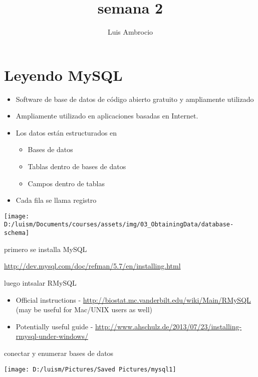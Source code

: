 \documentclass[
]{article}
\title{semana 2}
\author{Luis Ambrocio}
\date{}
\providecommand{\tightlist}{%
  \setlength{\itemsep}{0pt}\setlength{\parskip}{0pt}}
\begin{document}
\maketitle

\tableofcontents

\hypertarget{leyendo-mysql}{%
\section{Leyendo MySQL}\label{leyendo-mysql}}

\begin{itemize}
\tightlist
\item
  Software de base de datos de código abierto gratuito y ampliamente
  utilizado
\item
  Ampliamente utilizado en aplicaciones basadas en Internet.
\item
  Los datos están estructurados en

  \begin{itemize}
  \tightlist
  \item
    Bases de datos
  \item
    Tablas dentro de bases de datos
  \item
    Campos dentro de tablas
  \end{itemize}
\item
  Cada fila se llama registro
\end{itemize}

\begin{center}\texttt{[image: D:/luism/Documents/courses/assets/img/03\_ObtainingData/database-schema]} \end{center}

primero se installa MySQL

\url{http://dev.mysql.com/doc/refman/5.7/en/installing.html}

luego intsalar RMySQL

\begin{itemize}
\tightlist
\item
  Official instructions -
  \url{http://biostat.mc.vanderbilt.edu/wiki/Main/RMySQL} (may be useful
  for Mac/UNIX users as well)
\item
  Potentially useful guide -
  \url{http://www.ahschulz.de/2013/07/23/installing-rmysql-under-windows/}
\end{itemize}

conectar y enumerar bases de datos

\begin{center}\texttt{[image: D:/luism/Pictures/Saved Pictures/mysql1]} \end{center}
\end{document}
